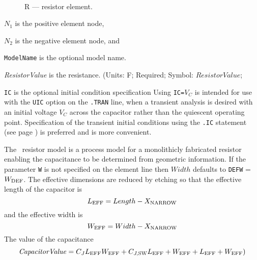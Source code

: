 \begin{figure}[h]
\centering
\ 
\caption{R --- resistor element.}
\end{figure}

{
}



\begin{widelist}
\item[$N_1$] is the positive element node,
\item[$N_2$] is the negative element  node, and
\item[{\tt ModelName}]  is  the optional  model name.
\item[{\it ResistorValue}]  is  the  resistance.
               (Units: F; Required; Symbol: $ResistorValue$;
\item[{\tt IC}] is the optional  initial condition specification
      Using {\tt IC=}$V_C$ is intended for use with the {\tt UIC} option
      on  the  {\tt .TRAN}  line,  when  a transient analysis is desired
      with an initial voltage $V_C$ across the capacitor
      rather than the quiescent operating point.
      Specification of the transient initial conditions using the {\tt .IC}
      statement (see page \pageref{.ICstatement}) is preferred and is more
      convenient.
\end{widelist}

{

\label{RESmodelsp3}




The \spicethree\ resistor model is a process model for a monolithicly
fabricated resistor enabling the capacitance to be determined from geometric
information.  If the parameter {\tt W} is not specified on the element
line then $Width$
defaults to {\tt DEFW} = $W_{\mbox{\scriptsize DEF}}$. The effective dimensions are reduced
by etching so that the effective length of the capacitor is
\begin{equation}
L_{\mbox{\scriptsize EFF}} = Length - X_{\mbox{\scriptsize NARROW}}
\end{equation}
and the effective width is
\begin{equation}
W_{\mbox{\scriptsize EFF}} = Width - X_{\mbox{\scriptsize NARROW}}
\end{equation}
The value of the capacitance
\begin{equation}
{\it CapacitorValue} = C_J L_{\mbox{\scriptsize EFF}} W_{\mbox{\scriptsize EFF}}
          + C_{J,\mbox{\scriptsize SW}} L_{\mbox{\scriptsize EFF}} +  W_{\mbox{\scriptsize EFF}} + L_{\mbox{\scriptsize EFF}} + W_{\mbox{\scriptsize EFF}})
\end{equation}
}

